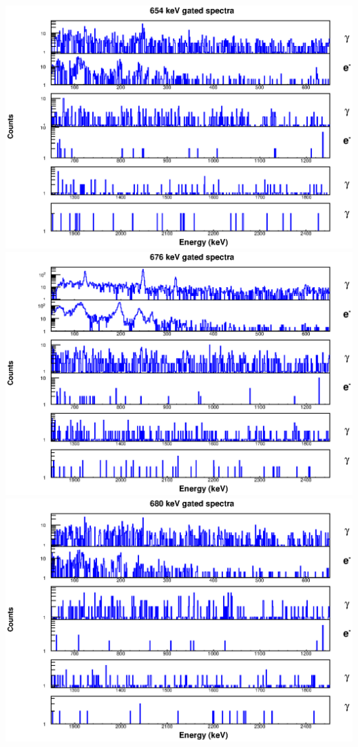 \begin{landscape}
\includegraphics[scale=1.1]{154Gd_Appendix/654_combined.eps}
\includegraphics[scale=1.1]{154Gd_Appendix/676_combined.eps}
\includegraphics[scale=1.1]{154Gd_Appendix/680_combined.eps}

\end{landscape}
